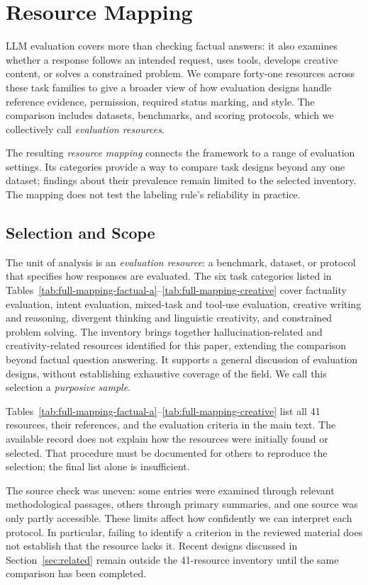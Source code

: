 \section{Resource Mapping}\label{sec:methodology}

LLM evaluation covers more than checking factual answers: it also examines
whether a response follows an intended request, uses tools, develops creative
content, or solves a constrained problem. We compare forty-one resources
across these task families to give a broader view of how evaluation designs
handle reference evidence, permission, required status marking, and style.
The comparison includes datasets, benchmarks, and scoring protocols, which
we collectively call \emph{evaluation resources}.

The resulting \emph{resource mapping} connects the framework to a range of
evaluation settings. Its categories provide a way to compare task designs
beyond any one dataset; findings about their prevalence remain limited to
the selected inventory. The mapping does not test the labeling rule's
reliability in practice.

\subsection{Selection and Scope}

The unit of analysis is an \emph{evaluation resource}: a benchmark, dataset,
or protocol that specifies how responses are evaluated. The six task categories listed in
Tables~\ref{tab:full-mapping-factual-a}--\ref{tab:full-mapping-creative} cover factuality evaluation, intent evaluation,
mixed-task and tool-use evaluation, creative writing and reasoning, divergent
thinking and linguistic creativity, and constrained problem solving.
The inventory brings together hallucination-related and creativity-related
resources identified for this paper, extending the comparison beyond
factual question answering. It supports a general discussion of evaluation
designs, without establishing exhaustive coverage of the field. We call
this selection a \emph{purposive sample}.

Tables~\ref{tab:full-mapping-factual-a}--\ref{tab:full-mapping-creative}
list all 41 resources, their references, and the evaluation criteria in the
main text. The available record does not explain how the resources were
initially found or selected. That procedure must be documented for others
to reproduce the selection; the final list alone is insufficient.

The source check was uneven: some entries were examined through relevant
methodological passages, others through primary summaries, and one source
was only partly accessible. These limits affect how confidently we can
interpret each protocol. In particular, failing to identify a criterion
in the reviewed material does not establish that the resource lacks it.
Recent designs discussed in Section~\ref{sec:related} remain outside the
41-resource inventory until the same comparison has been completed.

